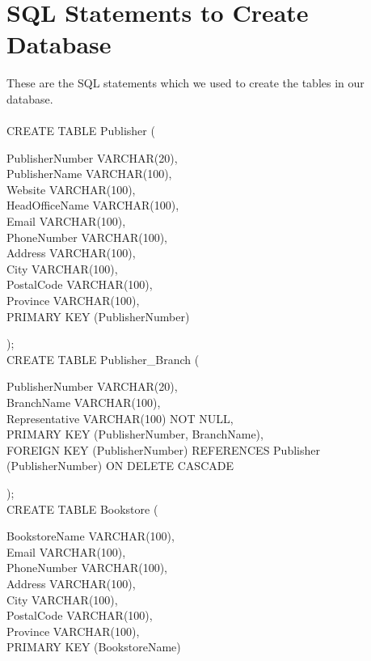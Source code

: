 \documentclass{scrreprt}
\begin{document}
\chapter{SQL Statements to Create Database}
These are the SQL statements which we used to create the tables in our database. \\\\
CREATE TABLE Publisher
(
\begin{adjustwidth}{1cm}{0cm}
    PublisherNumber VARCHAR(20),\\
    PublisherName   VARCHAR(100),\\
    Website         VARCHAR(100),\\
    HeadOfficeName  VARCHAR(100),\\
    Email           VARCHAR(100),\\
    PhoneNumber     VARCHAR(100),\\
    Address         VARCHAR(100),\\
    City            VARCHAR(100),\\
    PostalCode      VARCHAR(100),\\
    Province        VARCHAR(100),\\
    PRIMARY KEY (PublisherNumber)
\end{adjustwidth}
);\\
CREATE TABLE Publisher_Branch
(
\begin{adjustwidth}{1cm}{0cm}
    PublisherNumber VARCHAR(20),\\
    BranchName      VARCHAR(100),\\
    Representative  VARCHAR(100) NOT NULL,\\
    PRIMARY KEY (PublisherNumber, BranchName),\\
    FOREIGN KEY (PublisherNumber) REFERENCES Publisher (PublisherNumber) ON DELETE CASCADE
\end{adjustwidth}
);\\
CREATE TABLE Bookstore
(
\begin{adjustwidth}{1cm}{0cm}
    BookstoreName VARCHAR(100),\\
    Email         VARCHAR(100),\\
    PhoneNumber   VARCHAR(100),\\
    Address       VARCHAR(100),\\
    City          VARCHAR(100),\\
    PostalCode    VARCHAR(100),\\
    Province      VARCHAR(100),\\
    PRIMARY KEY (BookstoreName)
\end{adjustwidth}
\end{document}
